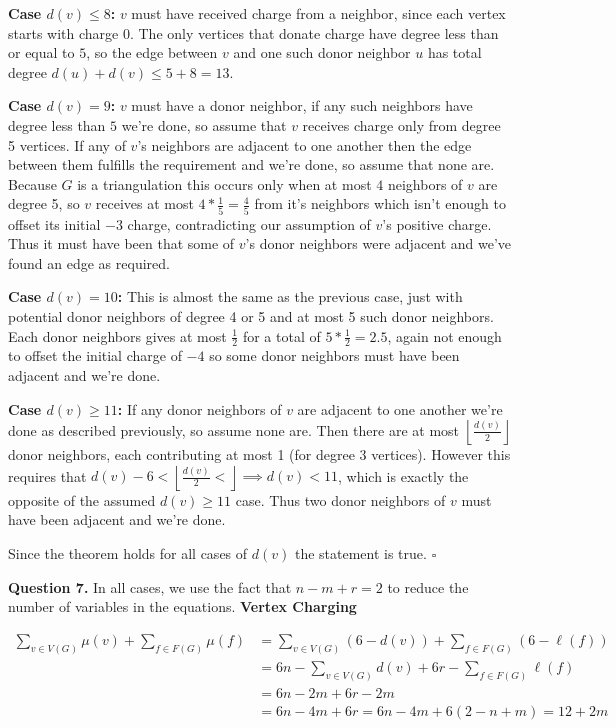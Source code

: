 \documentclass[letterpaper, reqno,11pt]{article}
\begin{document}
\medskip

{\noindent\bf Case $d(v)\leq 8$:} $v$ must have received charge from a neighbor, since each vertex starts with charge $0$. The only vertices that donate charge have degree less than or equal to $5$, so the edge between $v$ and one such donor neighbor $u$ has total degree $d(u)+d(v)\leq 5+8=13$.

{\noindent\bf Case $d(v)=9$:} $v$ must have a donor neighbor, if any such neighbors have degree less than $5$ we're done, so assume that $v$ receives charge only from degree 5 vertices. If any of $v$'s neighbors are adjacent to one another then the edge between them fulfills the requirement and we're done, so assume that none are. Because $G$ is a triangulation this occurs only when at most $4$ neighbors of $v$ are degree 5, so $v$ receives at most $4*\frac{1}{5}=\frac{4}{5}$ from it's neighbors which isn't enough to offset its initial $-3$ charge, contradicting our assumption of $v$'s positive charge. Thus it must have been that some of $v$'s donor neighbors were adjacent and we've found an edge as required. 

{\noindent\bf Case $d(v)=10$:} This is almost the same as the previous case, just with potential donor neighbors of degree 4 or 5 and at most 5 such donor neighbors. Each donor neighbors gives at most $\frac{1}{2}$ for a total of $5*\frac{1}{2}=2.5$, again not enough to offset the initial charge of $-4$ so some donor neighbors must have been adjacent and we're done.

{\noindent\bf Case $d(v)\geq 11$:} If any donor neighbors of $v$ are adjacent to one another we're done as described previously, so assume none are. Then there are at most $\left\lfloor \frac{d(v)}{2} \right\rfloor$ donor neighbors, each contributing at most 1 (for degree 3 vertices). However this requires that $d(v)-6< \left\lfloor \frac{d(v)}{2} <\right\rfloor\implies d(v)<11$, which is exactly the opposite of the assumed $d(v)\geq 11$ case. Thus two donor neighbors of $v$ must have been adjacent and we're done. 

\medskip

Since the theorem holds for all cases of $d(v)$ the statement is true. $\square$

{\medskip\noindent\bf Question 7.}  
In all cases, we use the fact that $n - m + r = 2$ to reduce the number of variables in the equations.
\textbf{Vertex Charging}

\begin{align*}
	\sum_{v \in V(G)}\mu(v) + \sum_{f\in F(G)} \mu(f) &= \sum_{v \in V(G)} (6 - d(v)) + \sum_{f \in F(G)} (6 - \ell(f))\\
&= 6n - \sum_{v \in V(G)} d(v) + 6r - \sum_{f \in F(G)} \ell (f)\\
&= 6n - 2m + 6r - 2m\\
&= 6n - 4m + 6r = 6n - 4m + 6(2 - n + m) = 12 + 2m
\end{align*}
\end{document}
